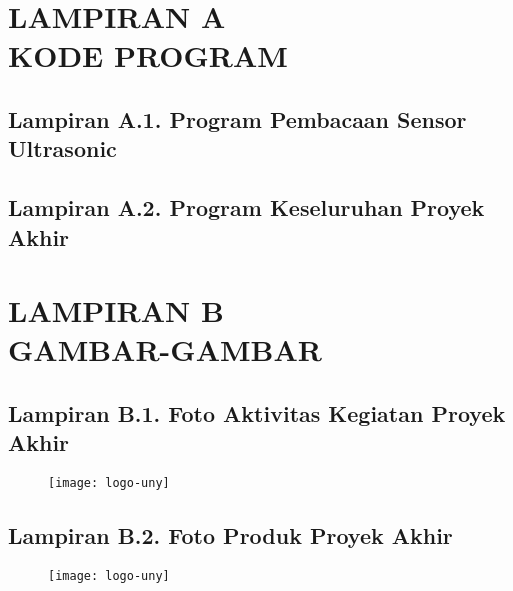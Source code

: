 
\appendix
\chapter*{LAMPIRAN A \\ KODE PROGRAM}

\section*{Lampiran A.1. Program Pembacaan Sensor Ultrasonic}
%

\hfill

\section*{Lampiran A.2. Program Keseluruhan Proyek Akhir}
%

\chapter*{LAMPIRAN B \\ GAMBAR-GAMBAR}

\section*{Lampiran B.1. Foto Aktivitas Kegiatan Proyek Akhir}
\begin{figure}[H]
    \centering
    \texttt{[image: logo-uny]}
\end{figure}

\hfill

\section*{Lampiran B.2. Foto Produk Proyek Akhir}
\begin{figure}[H]
    \centering
    \texttt{[image: logo-uny]}
\end{figure}
